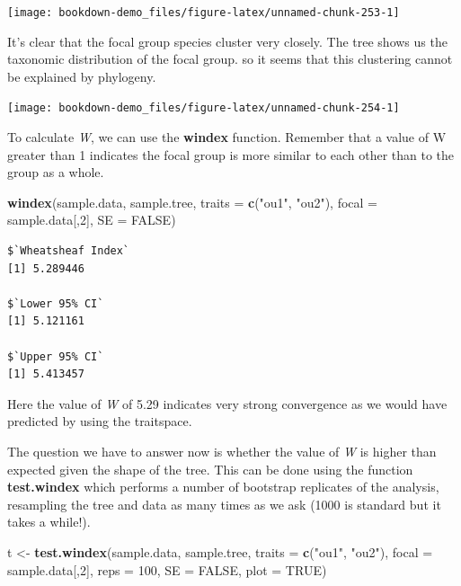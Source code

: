 \documentclass[
]{book}
\newenvironment{Shaded}{\begin{snugshade}}{\end{snugshade}}
\newcommand{\DataTypeTok}[1]{\textcolor[rgb]{0.13,0.29,0.53}{#1}}
\newcommand{\DecValTok}[1]{\textcolor[rgb]{0.00,0.00,0.81}{#1}}
\newcommand{\KeywordTok}[1]{\textcolor[rgb]{0.13,0.29,0.53}{\textbf{#1}}}
\newcommand{\NormalTok}[1]{#1}
\newcommand{\OtherTok}[1]{\textcolor[rgb]{0.56,0.35,0.01}{#1}}
\newcommand{\StringTok}[1]{\textcolor[rgb]{0.31,0.60,0.02}{#1}}
\begin{document}
\begin{center}\texttt{[image: bookdown-demo\_files/figure-latex/unnamed-chunk-253-1]} \end{center}

It's clear that the focal group species cluster very closely. The tree shows us the taxonomic distribution of the focal group. so it seems that this clustering cannot be explained by phylogeny.

\begin{center}\texttt{[image: bookdown-demo\_files/figure-latex/unnamed-chunk-254-1]} \end{center}

To calculate \emph{W}, we can use the \textbf{windex} function. Remember that a value of W greater than 1 indicates the focal group is more similar to each other than to the group as a whole.

\begin{Shaded}
\begin{Highlighting}[]
\KeywordTok{windex}\NormalTok{(sample.data, sample.tree,}
       \DataTypeTok{traits =} \KeywordTok{c}\NormalTok{(}\StringTok{"ou1"}\NormalTok{, }\StringTok{"ou2"}\NormalTok{),}
       \DataTypeTok{focal =}\NormalTok{ sample.data[,}\DecValTok{2}\NormalTok{],}
       \DataTypeTok{SE =} \OtherTok{FALSE}\NormalTok{)}
\end{Highlighting}
\end{Shaded}

\begin{verbatim}
$`Wheatsheaf Index`
[1] 5.289446

$`Lower 95% CI`
[1] 5.121161

$`Upper 95% CI`
[1] 5.413457
\end{verbatim}

Here the value of \emph{W} of 5.29 indicates very strong convergence as we would have predicted by using the traitspace.

The question we have to answer now is whether the value of \emph{W} is higher than expected given the shape of the tree. This can be done using the function \textbf{test.windex} which performs a number of bootstrap replicates of the analysis, resampling the tree and data as many times as we ask (1000 is standard but it takes a while!).

\begin{Shaded}
\begin{Highlighting}[]
\NormalTok{t \textless{}{-}}\StringTok{ }\KeywordTok{test.windex}\NormalTok{(sample.data, sample.tree,}
       \DataTypeTok{traits =} \KeywordTok{c}\NormalTok{(}\StringTok{"ou1"}\NormalTok{, }\StringTok{"ou2"}\NormalTok{),}
       \DataTypeTok{focal =}\NormalTok{ sample.data[,}\DecValTok{2}\NormalTok{], }\DataTypeTok{reps =} \DecValTok{100}\NormalTok{,}
       \DataTypeTok{SE =} \OtherTok{FALSE}\NormalTok{, }\DataTypeTok{plot =} \OtherTok{TRUE}\NormalTok{)}
\end{Highlighting}
\end{Shaded}
\end{document}
